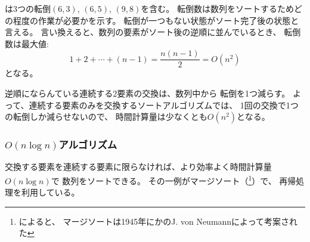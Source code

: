 は3つの転倒$(6,3)$, $(6,5)$, $(9,8)$を含む。
転倒数は数列をソートするためどの程度の作業が必要かを示す。
転倒が一つもない状態がソート完了後の状態と言える。
言い換えると、数列の要素がソート後の逆順に並んでいるとき、
転倒数は最大値:
\[1+2+\cdots+(n-1)=\frac{n(n-1)}{2} = O(n^2)\]
となる。

逆順にならんている連続する2要素の交換は、数列中から
転倒を1つ減らす。
よって、連続する要素のみを交換するソートアルゴリズムでは、
1回の交換で1つの転倒しか減らせないので、
時間計算量は少なくとも$O(n^2)$となる。

\begin{comment}
\subsubsection{$O(n \log n)$ algorithms}

\index{merge sort}

It is possible to sort an array efficiently
in $O(n \log n)$ time using algorithms
that are not limited to swapping consecutive elements.
One such algorithm is \key{merge sort}\footnote{According to \cite{knu983},
merge sort was invented by J. von Neumann in 1945.},
which is based on recursion.
\end{comment}

\subsubsection{$O(n \log n)$アルゴリズム}


交換する要素を連続する要素に限らなければ、より効率よく時間計算量$O(n \log n)$で
数列をソートできる。
その一例がマージソート（\footnote{\cite{knu983}によると、
マージソートは1945年にかのJ. von Neumannによって考案された}）で、
再帰処理を利用している。

\begin{comment}
Merge sort sorts a subarray \texttt{array}$[a \ldots b]$ as follows:

\begin{enumerate}
\item If $a=b$, do not do anything, because the subarray is already sorted.
\item Calculate the position of the middle element: $k=\lfloor (a+b)/2 \rfloor$.
\item Recursively sort the subarray \texttt{array}$[a \ldots k]$.
\item Recursively sort the subarray \texttt{array}$[k+1 \ldots b]$.
\item \emph{Merge} the sorted subarrays \texttt{array}$[a \ldots k]$ and
\texttt{array}$[k+1 \ldots b]$
into a sorted subarray \texttt{array}$[a \ldots b]$.
\end{enumerate}
\end{comment}

